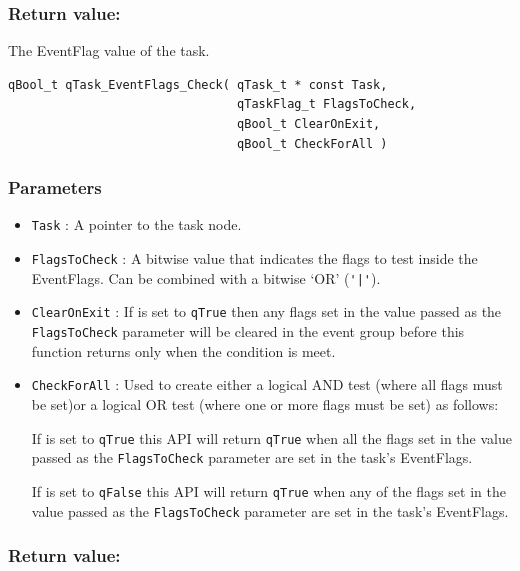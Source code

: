 \documentclass{article}
\begin{document}
\subsubsection*{Return value:}

The EventFlag value of the task.

\noindent\hrulefill
\newline


\begin{lstlisting}[style=CStyle]
qBool_t qTask_EventFlags_Check( qTask_t * const Task, 
                                qTaskFlag_t FlagsToCheck, 
                                qBool_t ClearOnExit, 
                                qBool_t CheckForAll )
\end{lstlisting} 

\subsubsection*{Parameters}
\begin{itemize}
    \item \lstinline{Task} : A pointer to the task node.
    \item \lstinline{FlagsToCheck} : A bitwise value that indicates the flags to test inside the EventFlags. Can be combined with a bitwise ‘OR’ (\lstinline{'|'}).
    \item \lstinline{ClearOnExit} : If is set to \lstinline{qTrue} then any flags set in the value passed as the \lstinline{FlagsToCheck} parameter will be cleared in the event group before this function returns only when the condition is meet.
    \item \lstinline{CheckForAll} : Used to create either a logical AND test (where all flags must be set)or a logical OR test (where one or more flags must be set) as follows:
    
    If is set to \lstinline{qTrue} this API will return \lstinline{qTrue} when all the flags set in the value passed as the \lstinline{FlagsToCheck} parameter are set in the task's EventFlags.
    
    If is set to \lstinline{qFalse} this API will return \lstinline{qTrue} when any of the flags set in the value passed as the \lstinline{FlagsToCheck} parameter are set in the task's EventFlags.

\end{itemize}

\subsubsection*{Return value:}
\end{document}
